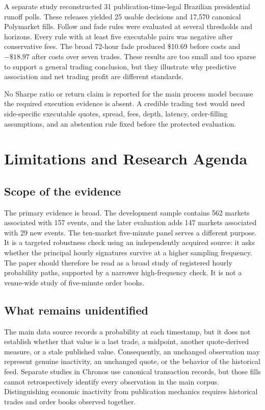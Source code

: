 \documentclass[11pt]{article}
\begin{document}
A separate study reconstructed 31 publication-time-legal Brazilian presidential runoff polls.
These releases yielded 25 usable decisions and 17,570 canonical Polymarket fills. Follow and fade
rules were evaluated at several thresholds and horizons. Every rule with at least five executable
pairs was negative after conservative fees. The broad 72-hour fade produced \$10.69 before costs
and $-\$18.97$ after costs over seven trades. These results are too small and too sparse to support
a general trading conclusion, but they illustrate why predictive association and net trading
profit are different standards.

No Sharpe ratio or return claim is reported for the main process model because the required
execution evidence is absent. A credible trading test would need side-specific executable quotes,
spread, fees, depth, latency, order-filling assumptions, and an abstention rule fixed before the
protected evaluation.

\section{Limitations and Research Agenda}

\subsection{Scope of the evidence}

The primary evidence is broad. The development sample contains 562 markets associated with 157
events, and the later evaluation adds 147 markets associated with 29 new events. The ten-market
five-minute panel serves a different purpose. It is a targeted robustness check using an
independently acquired source: it asks whether the principal hourly signatures survive at a
higher sampling frequency. The paper should therefore be read as a broad study of registered
hourly probability paths, supported by a narrower high-frequency check. It is not a venue-wide
study of five-minute order books.

\subsection{What remains unidentified}

The main data source records a probability at each timestamp, but it does not establish whether
that value is a last trade, a midpoint, another quote-derived measure, or a stale published value.
Consequently, an unchanged observation may represent genuine inactivity, an unchanged quote, or
the behavior of the historical feed. Separate studies in Chronos use canonical transaction
records, but those fills cannot retrospectively identify every observation in the main corpus.
Distinguishing economic inactivity from publication mechanics requires historical trades and
order books observed together.
\end{document}
